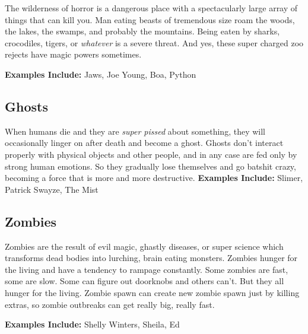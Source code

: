 The wilderness of horror is a dangerous place with a spectacularly large array of things that can kill you. Man eating beasts of tremendous size roam the woods, the lakes, the swamps, and probably the mountains. Being eaten by sharks, crocodiles, tigers, or \textit{whatever} is a severe threat. And yes, these super charged zoo rejects have magic powers sometimes.

\textbf{Examples Include:} Jaws, Joe Young, Boa, Python

\subsection{Ghosts} 

When humans die and they are \textit{super pissed} about something, they will occasionally linger on after death and become a ghost. Ghosts don't interact properly with physical objects and other people, and in any case are fed only by strong human emotions. So they gradually lose themselves and go batshit crazy, becoming a force that is more and more destructive.
\textbf{Examples Include:} Slimer, Patrick Swayze, The Mist

\subsection{Zombies} 

Zombies are the result of evil magic, ghastly diseases, or super science which transforms dead bodies into lurching, brain eating monsters. Zombies hunger for the living and have a tendency to rampage constantly. Some zombies are fast, some are slow. Some can figure out doorknobs and others can't. But they all hunger for the living. Zombie spawn can create new zombie spawn just by killing extras, so zombie outbreaks can get really big, really fast.

\textbf{Examples Include:} Shelly Winters, Sheila, Ed
